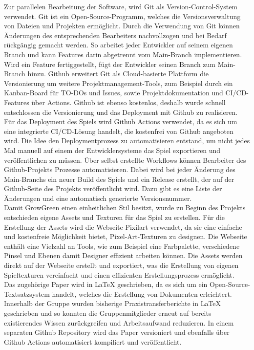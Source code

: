 \newpage
Zur parallelen Bearbeitung der Software, wird Git als Version-Control-System verwendet.
Git ist ein Open-Source-Programm, welches die Versionsverwaltung von Dateien und Projekten ermöglicht.
Durch die Verwendung von Git können Änderungen des entsprechenden Bearbeiters nachvollzogen und bei Bedarf rückgängig 
gemacht werden.
So arbeitet jeder Entwickler auf seinem eigenen Branch und kann Features darin abgetrennt vom Main-Branch 
implementieren.
Wird ein Feature fertiggestellt, fügt der Entwickler seinen Branch zum Main-Branch hinzu.
Github erweitert Git als Cloud-basierte Plattform die Versionierung um weitere Projektmanagement-Tools, zum
Beispiel durch ein Kanban-Board für TO-DOs und Issues, sowie Projektdokumentation und CI/CD-Features über Actions. 
Github ist ebenso kostenlos, deshalb wurde schnell entschlossen die Versionierung und das Deployment mit Github
zu realisieren.\\
\newline
Für das Deployment des Spiels wird Github Actions verwendet, da es sich um eine integrierte CI/CD-Lösung handelt, die
kostenfrei von Github angeboten wird.
Die Idee den Deploymentprozess zu automatisieren entstand, um nicht jedes Mal manuell auf einem der 
Entwicklersysteme das Spiel exportieren und veröffentlichen zu müssen.
Über selbst erstellte Workflows können Bearbeiter des Github-Projekts Prozesse automatisieren.
Dabei wird bei jeder Änderung des Main-Branchs ein neuer Build des Spiels und ein Release erstellt, der auf der Github-Seite des Projekts veröffentlicht wird.
Dazu gibt es eine Liste der 
Änderungen und eine automatisch generierte Versionsnummer.\\
\newline
Damit GrowGreen einen einheitlichen Stil besitzt, wurde zu Beginn des Projekts entschieden eigene
Assets und Texturen für das Spiel zu erstellen.
Für die Erstellung der Assets wird die Webseite Pixilart verwendet, da sie eine einfache und kostenfreie Möglichkeit
bietet, Pixel-Art-Texturen zu designen.
Die Webseite enthält eine Vielzahl an Tools, wie zum Beispiel eine Farbpalette, verschiedene
Pinsel und Ebenen damit Designer effizient arbeiten können.
Die Assets werden direkt auf der Webseite erstellt und exportiert, was die Erstellung von eigenen
Spieltexturen vereinfacht und einen effizienten Erstellungsprozess ermöglicht.\\
\newline
Das zugehörige Paper wird in \LaTeX{} geschrieben, da es sich um ein Open-Source-Textsatzsystem handelt, welches die
Erstellung von Dokumenten erleichtert.
Innerhalb der Gruppe wurden bisherige Praxistransferberichte in \LaTeX{} geschrieben und so 
konnten die Gruppenmitglieder erneut auf bereits existierendes Wissen zurückgreifen und Arbeitsaufwand reduzieren.
In einem separaten Github Repository wird das Paper versioniert und ebenfalls über Github Actions automatisiert 
kompiliert und veröffentlicht.